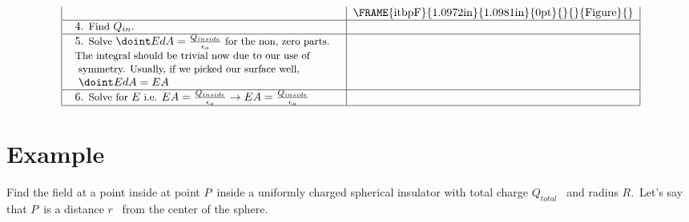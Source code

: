 \documentclass{report}
\begin{document}
\begin{equation*}
\begin{tabular}{|l|l|}
\begin{tabular}{l}
\end{tabular}
& \FRAME{itbpF}{1.0972in}{1.0981in}{0pt}{}{}{Figure}{\special{language
"Scientific Word";type "GRAPHIC";maintain-aspect-ratio TRUE;display
"USEDEF";valid_file "T";width 1.0972in;height 1.0981in;depth
0pt;original-width 1.938in;original-height 1.9398in;cropleft "0";croptop
"1";cropright "1";cropbottom "0";tempfilename
'T3KTF306.wmf';tempfile-properties "XPR";}} \\ \hline
$%
\begin{tabular}{l}
4. {\small Find }$Q_{in}.$%
\end{tabular}%
$ &  \\ \hline
\begin{tabular}{l}
5. {\small Solve }$\doint EdA=\frac{Q_{inside}}{\epsilon _{o}}${\small \ for
the non, zero parts.} \\ 
{\small The integral should be trivial now due to our use of} \\ 
{\small \ symmetry. Usually, if we picked our surface well,} \\ 
{\small \ }$\doint EdA=EA$%
\end{tabular}%
{\small \ } &  \\ \hline
\begin{tabular}{l}
6. {\small Solve for }$E${\small \ i.e. }$EA=\frac{Q_{inside}}{\epsilon _{o}}%
\rightarrow EA=\frac{Q_{inside}}{\epsilon _{o}}$%
\end{tabular}
&  \\ \hline
\end{tabular}%
\end{equation*}

\normalsize%

\section{Example}

{\small Find the field at a point inside at point }$P${\small \ inside a
uniformly charged spherical insulator with total charge }$Q_{total}${\small %
\ and radius }$R.${\small \ Let's say that }$P${\small \ is a distance }$r$%
{\small \ from the center of the sphere.}

\small%
\end{document}
